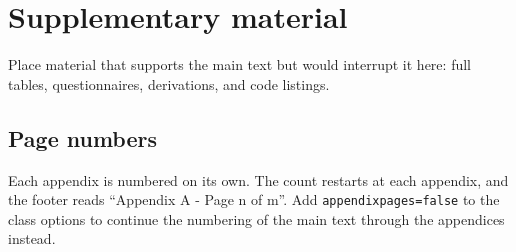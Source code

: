 \chapter{Supplementary material}
Place material that supports the main text but would interrupt it here: full tables, questionnaires, derivations, and code listings.

\section{Page numbers}
Each appendix is numbered on its own. The count restarts at each appendix, and the footer reads ``Appendix A - Page n of m''. Add \texttt{appendixpages=false} to the class options to continue the numbering of the main text through the appendices instead.

